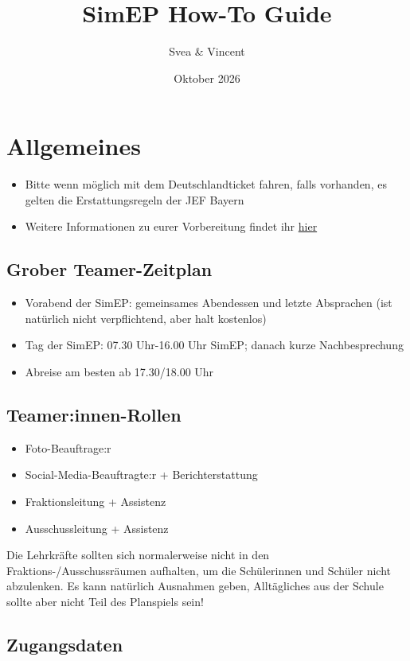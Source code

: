 \documentclass{article}
\title{SimEP How-To Guide}
\author{Svea \& Vincent}
\date{Oktober 2026}
\begin{document}
	\section{Allgemeines}
	
	\begin{itemize}
	\item Bitte wenn möglich mit dem Deutschlandticket fahren, falls vorhanden, es gelten die Erstattungsregeln der JEF Bayern
	\item Weitere Informationen zu eurer Vorbereitung findet ihr \href{https://drive.google.com/drive/folders/1zBLLjXlWXjD55VzzwxbWSNNgrS0o0mv4}{hier}
	\end{itemize}
	
	\subsection{Grober Teamer-Zeitplan}	
	
	\begin{itemize}
	\item Vorabend der SimEP: gemeinsames Abendessen und letzte Absprachen (ist natürlich nicht verpflichtend, aber halt kostenlos)
	\item Tag der SimEP: 07.30 Uhr-16.00 Uhr SimEP; danach kurze Nachbesprechung
	\item Abreise am besten ab 17.30/18.00 Uhr
	\end{itemize}
	
	\subsection{Teamer:innen-Rollen}
	
	\begin{itemize}
	\item Foto-Beauftrage:r
	\item Social-Media-Beauftragte:r + Berichterstattung
	\item Fraktionsleitung + Assistenz
	\item Ausschussleitung + Assistenz
	\end{itemize}
	
	Die Lehrkräfte sollten sich normalerweise nicht in den Fraktions-/Ausschussräumen aufhalten, um die Schülerinnen und Schüler nicht abzulenken. Es kann natürlich Ausnahmen geben, Alltägliches aus der Schule sollte aber nicht Teil des Planspiels sein!

	
	\subsection{Zugangsdaten}
	
\end{document}
